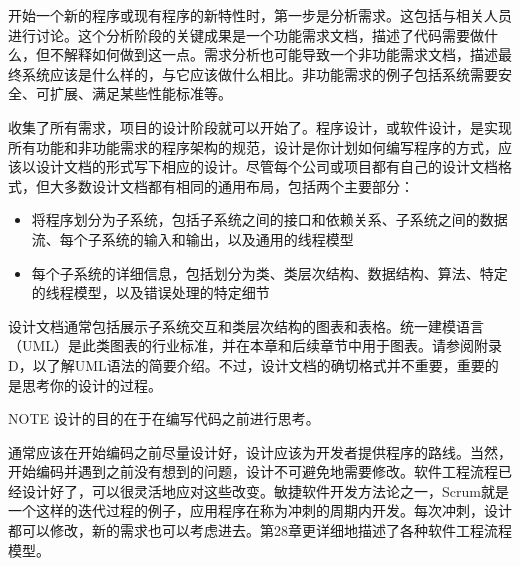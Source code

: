 开始一个新的程序或现有程序的新特性时，第一步是分析需求。这包括与相关人员进行讨论。这个分析阶段的关键成果是一个功能需求文档，描述了代码需要做什么，但不解释如何做到这一点。需求分析也可能导致一个非功能需求文档，描述最终系统应该是什么样的，与它应该做什么相比。非功能需求的例子包括系统需要安全、可扩展、满足某些性能标准等。

收集了所有需求，项目的设计阶段就可以开始了。程序设计，或软件设计，是实现所有功能和非功能需求的程序架构的规范，设计是你计划如何编写程序的方式，应该以设计文档的形式写下相应的设计。尽管每个公司或项目都有自己的设计文档格式，但大多数设计文档都有相同的通用布局，包括两个主要部分：

\begin{itemize}
\item
将程序划分为子系统，包括子系统之间的接口和依赖关系、子系统之间的数据流、每个子系统的输入和输出，以及通用的线程模型

\item
每个子系统的详细信息，包括划分为类、类层次结构、数据结构、算法、特定的线程模型，以及错误处理的特定细节
\end{itemize}

设计文档通常包括展示子系统交互和类层次结构的图表和表格。统一建模语言（UML）是此类图表的行业标准，并在本章和后续章节中用于图表。请参阅附录D，以了解UML语法的简要介绍。不过，设计文档的确切格式并不重要，重要的是思考你的设计的过程。

\begin{myNotic}{NOTE}
设计的目的在于在编写代码之前进行思考。
\end{myNotic}

通常应该在开始编码之前尽量设计好，设计应该为开发者提供程序的路线。当然，开始编码并遇到之前没有想到的问题，设计不可避免地需要修改。软件工程流程已经设计好了，可以很灵活地应对这些改变。敏捷软件开发方法论之一，Scrum就是一个这样的迭代过程的例子，应用程序在称为冲刺的周期内开发。每次冲刺，设计都可以修改，新的需求也可以考虑进去。第28章更详细地描述了各种软件工程流程模型。






























